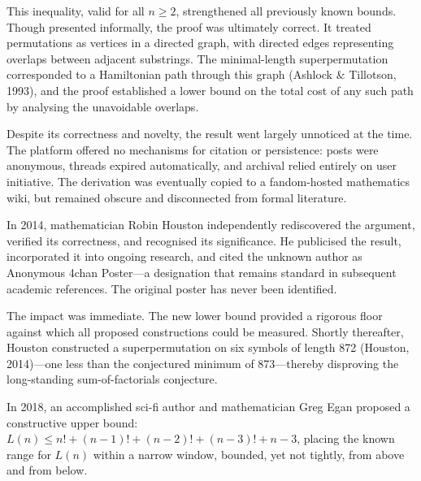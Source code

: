 This inequality, valid for all $n \geq 2$, strengthened all previously known bounds. Though presented informally, the proof was ultimately correct. It treated permutations as vertices in a directed graph, with directed edges representing overlaps between adjacent substrings. The minimal-length superpermutation corresponded to a Hamiltonian path through this graph (Ashlock \& Tillotson, 1993), and the proof established a lower bound on the total cost of any such path by analysing the unavoidable overlaps.

Despite its correctness and novelty, the result went largely unnoticed at the time. The platform offered no mechanisms for citation or persistence: posts were anonymous, threads expired automatically, and archival relied entirely on user initiative. The derivation was eventually copied to a fandom-hosted mathematics wiki, but remained obscure and disconnected from formal literature.

In 2014, mathematician Robin Houston independently rediscovered the argument, verified its correctness, and recognised its significance. He publicised the result, incorporated it into ongoing research, and cited the unknown author as \QENOpen{}Anonymous 4chan Poster\QENClose{}—a designation that remains standard in subsequent academic references. The original poster has never been identified.

The impact was immediate. The new lower bound provided a rigorous floor against which all proposed constructions could be measured. Shortly thereafter, Houston constructed a superpermutation on six symbols of length 872 (Houston, 2014)—one less than the conjectured minimum of 873—thereby disproving the long-standing sum-of-factorials conjecture.

In 2018, an accomplished sci-fi author and mathematician Greg Egan proposed a constructive upper bound: $L(n) \leq n! + (n-1)! + (n-2)! + (n-3)! + n - 3$, placing the known range for $L(n)$ within a narrow window, bounded, yet not tightly, from above and from below.

